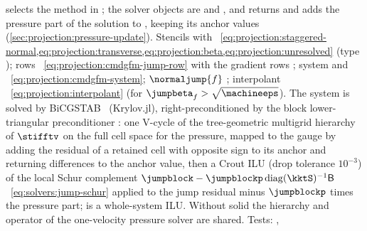 \begin{implnote}
selects the method in ; the solver objects are
 and
, and
returns  and adds the pressure part of the
solution to , keeping its anchor values
(\cref{sec:projection:pressure-update}). Stencils
with ~\cref{eq:projection:staggered-normal,eq:projection:transverse,eq:projection:beta,eq:projection:unresolved}
(type );
rows ~\cref{eq:projection:cmdgfm-jump-row}
with the gradient rows ;
system 
and ~\cref{eq:projection:cmdgfm-system};
$\normaljump{f}$ ;
interpolant ~\cref{eq:projection:interpolant}
(for $\jumpbeta_f>\sqrt{\machineeps}$). The system is solved by BiCGSTAB~\cite{vandervorst1992}
(Krylov.jl), right-preconditioned by the block lower-triangular
preconditioner :
one V-cycle of the tree-geometric multigrid hierarchy of $\stifftv$ on the
full cell space for the pressure, mapped to the gauge by adding the residual
of a retained cell with opposite sign to its anchor and returning differences
to the anchor value, then a Crout ILU (drop tolerance $10^{-3}$) of the
local Schur complement $\jumpblock-\jumpblockp\operatorname{diag}(\kktS)^{-1}\mathsf B$~\cref{eq:solvers:jump-schur}
applied to the jump residual minus $\jumpblockp$ times the
pressure part;  is a whole-system ILU. Without solid the hierarchy
and operator of the one-velocity pressure solver are shared. Tests:
,

\end{implnote}
